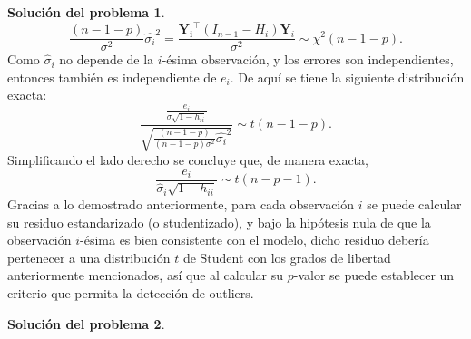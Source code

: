 \documentclass[twoside,12pt]{article}
\theoremstyle{definition}
\newtheorem{soln}{Solución del problema}
\begin{document}
\begin{soln}
\[
\frac{(n-1-p)}{\sigma^2}\hat{\sigma_i}^2= \frac{\mathbf{Y_i}^{\top}(I_{n-1}-H_i) \mathbf{Y}_i}{\sigma^2} \sim \chi^2(n-1-p).
\]
Como $\hat{\sigma}_i$ no depende de la $i$-ésima observación, y los errores son independientes, entonces también es independiente de $e_i$. De aquí se tiene la siguiente distribución exacta:
\[
\frac{\frac{e_i}{\sigma\sqrt{1-h_{ii}}}}{\sqrt{\frac{(n-1-p)}{(n-1-p)\sigma^2}\hat{\sigma_i}^2}} \sim t(n-1-p).
\]
Simplificando el lado derecho se concluye que, de manera exacta,
\[
\frac{e_i}{\hat{\sigma}_i \sqrt{1-h_{i i}}}\sim t(n-p-1).
\]
Gracias a lo demostrado anteriormente, para cada observación $i$ se puede calcular su residuo estandarizado (o studentizado), y bajo la hipótesis nula de que la observación $i$-ésima es bien consistente con el modelo, dicho residuo debería pertenecer a una distribución $t$ de Student con los grados de libertad anteriormente mencionados, así que al calcular su $p$-valor se puede establecer un criterio que permita la detección de outliers.
\end{soln}

\newpage
\begin{soln}

\end{soln}
\end{document}
